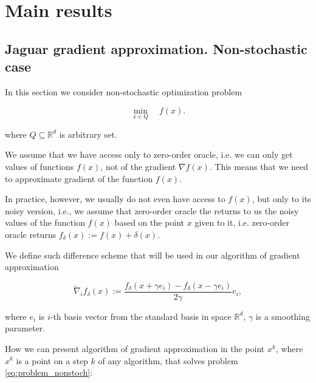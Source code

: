 
\section{Main results}

    \subsection{Jaguar gradient approximation. Non-stochastic case}
    \label{sect:JAGUAR_nonstoch}

        In this section we consider non-stochastic optimization problem 
    
        \begin{equation}
        \label{eq:problem_nonstoch}
            \underset{x \in Q}{\min} \quad f(x).
        \end{equation}

        where $Q \subseteq \mathbb{R}^d$ is arbitrary set.

        We assume that we have access only to zero-order oracle, i.e. we can only get values of functions $f(x)$, not of the gradient $\nabla f(x)$. This means that we need to approximate gradient of the function $f(x)$. 
        
        In practice, however, we usually do not even have access to $f(x)$, but only to its noisy version, i.e., we assume that zero-order oracle the returns to us the noisy values of the function $f(x)$ based on the point $x$ given to it, i.e. zero-order oracle returns $f_{\delta}(x) := f(x) + \delta(x)$.

        We define such difference scheme that will be used in our algorithm of gradient approximation

        \begin{equation}\label{eq:opf_nonstoch}
            \widetilde{\nabla}_if_\delta(x) :=  \dfrac{f_\delta(x + \gamma e_i) - f_\delta(x - \gamma e_i)}{2 \gamma} e_i,
        \end{equation}

        where $e_i$ is $i$-th basis vector from the standard basis in space $\mathbb{R}^d$, $\gamma$ is a smoothing parameter.

        How we can present algorithm of gradient approximation in the point $x^k$, where $x^k$ is a point on a step $k$ of any algorithm, that solves problem \eqref{eq:problem_nonstoch}:
    
